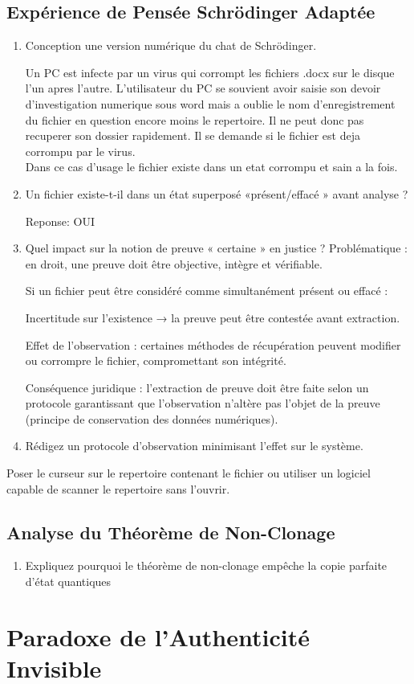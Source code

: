 \documentclass[11pt,a4paper]{article}
\begin{document}
\subsection{Expérience de Pensée Schrödinger Adaptée}

\begin{enumerate}
    \item Conception une version numérique du chat de Schrödinger.

    Un PC est infecte par un virus qui corrompt les fichiers .docx sur le disque l'un apres l'autre. L'utilisateur du PC se souvient avoir saisie son devoir d'investigation numerique sous word mais a oublie le nom d'enregistrement du fichier en question encore moins le repertoire. Il ne peut donc pas recuperer son dossier rapidement. Il se demande si le fichier est deja corrompu par le virus. \\
    Dans ce cas d'usage le fichier existe dans un etat corrompu et sain a la fois.
    
    \item Un fichier existe-t-il dans un état superposé «présent/effacé » avant analyse ?

    Reponse: OUI
    
    \item Quel impact sur la notion de preuve « certaine » en justice ?
Problématique : en droit, une preuve doit être objective, intègre et vérifiable.

Si un fichier peut être considéré comme simultanément présent ou effacé :

Incertitude sur l’existence → la preuve peut être contestée avant extraction.

Effet de l’observation : certaines méthodes de récupération peuvent modifier ou corrompre le fichier, compromettant son intégrité.

Conséquence juridique : l’extraction de preuve doit être faite selon un protocole garantissant que l’observation n’altère pas l’objet de la preuve (principe de conservation des données numériques).

    \item Rédigez un protocole d’observation minimisant l’effet sur le système.
\end{enumerate}

Poser le curseur sur le repertoire contenant le fichier ou utiliser un logiciel capable de scanner le repertoire sans l'ouvrir.

\subsection{Analyse du Théorème de Non-Clonage}

\begin{enumerate}
    \item Expliquez pourquoi le théorème de non-clonage empêche la copie parfaite d’état quantiques
    
\end{enumerate}

\section{Paradoxe de l’Authenticité Invisible}
\end{document}
